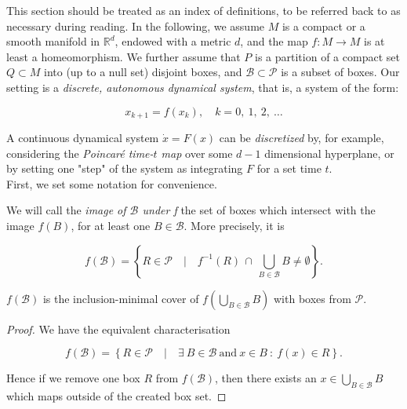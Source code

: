 This section should be treated as an index of definitions, to be referred back to as 
necessary during reading. In the following, we assume $M$ is a compact or a smooth manifold 
in $\mathbb{R}^d$, endowed with a metric $d$, and the 
map $f: M \to M$ is at least a homeomorphism. We further assume that $P$ is a partition 
of a compact set $Q \subset M$ into (up to a null set) disjoint boxes, and 
$\mathcal{B} \subset \mathcal{P}$ is a subset of boxes. Our setting is a 
\emph{discrete, autonomous dynamical system}, that is, a system of the form:

\begin{equation}
    x_{k+1} = f(x_k), \quad k = 0,\ 1,\ 2,\ \dotsc
\end{equation}

A continuous dynamical system $\dot{x} = F(x)$ can be \emph{discretized} by, for example,
considering the \emph{Poincaré time-$t$ map} over some $d-1$ dimensional hyperplane,
or by setting one "step" of the system as integrating $F$ for a set time $t$. \\

First, we set some notation for convenience.

\begin{definition}
    We will call the \emph{image of $\mathcal{B}$ under f} 
    the set of boxes which intersect with the image $f(B)$, for at least one 
    $B \in \mathcal{B}$. More precisely, it is 
    
    \begin{equation}
        f (\mathcal{B}) = \left\{
            R \in \mathcal{P} \quad \vert \quad 
            f^{-1} (R)\, \cap\, \bigcup\limits_{B \in \mathcal{B}} B \neq \emptyset
        \right\}.
    \end{equation}

\end{definition}

\begin{theorem}
    $f(\mathcal{B})$ is the inclusion-minimal cover of $f(\bigcup_{B \in \mathcal{B}} B)$
    with boxes from $\mathcal{P}$.
\end{theorem}

\begin{proof}
    We have the equivalent characterisation

    \begin{equation}
        f(\mathcal{B}) = \left\{
            R \in \mathcal{P} \quad \vert \quad
            \exists\ B \in \mathcal{B}\ \text{and}\ x \in B\ :\ f(x) \in R
        \right\}.
    \end{equation}

    Hence if we remove one box $R$ from $f(\mathcal{B})$, then there exists an 
    $x \in \bigcup_{B \in \mathcal{B}} B$ which maps outside of the created box set.

\end{proof}

